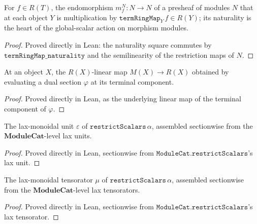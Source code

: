 \begin{definition}
  \label{def:global_smul}
  For \(f \in R(T)\), the endomorphism \(m_f^{N} : N \to N\) of a presheaf of modules
  \(N\) that at each object \(Y\) is multiplication by \(\mathtt{termRingMap}_Y\,f \in
  R(Y)\); its naturality is the heart of the global-scalar action on morphism modules.
\end{definition}
\begin{proof}
  \leanok
  Proved directly in Lean: the naturality square commutes by
  \(\mathtt{termRingMap\_naturality}\) and the semilinearity of the restriction maps of
  \(N\).
\end{proof}

\begin{definition}
  \label{def:eval_lin}
  At an object \(X\), the \(R(X)\)-linear map \(M(X) \to R(X)\) obtained by evaluating
  a dual section \(\varphi\) at its terminal component.
\end{definition}
\begin{proof}
  \leanok
  Proved directly in Lean, as the underlying linear map of the terminal component of
  \(\varphi\).
\end{proof}

\begin{definition}
  \label{def:restrict_scalars_lax_epsilon}
  The lax-monoidal unit \(\varepsilon\) of \(\mathtt{restrictScalars}\,\alpha\),
  assembled sectionwise from the \(\mathbf{ModuleCat}\)-level lax units.
\end{definition}
\begin{proof}
  \leanok
  Proved directly in Lean, sectionwise from
  \(\mathtt{ModuleCat.restrictScalars}\)'s lax unit.
\end{proof}

\begin{definition}
  \label{def:restrict_scalars_lax_mu}
  The lax-monoidal tensorator \(\mu\) of \(\mathtt{restrictScalars}\,\alpha\),
  assembled sectionwise from the \(\mathbf{ModuleCat}\)-level lax tensorators.
\end{definition}
\begin{proof}
  \leanok
  Proved directly in Lean, sectionwise from
  \(\mathtt{ModuleCat.restrictScalars}\)'s lax tensorator.
\end{proof}


